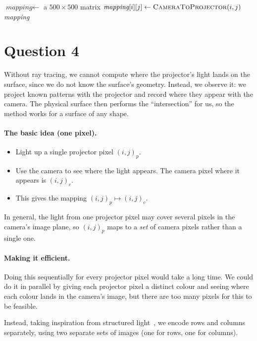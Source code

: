 \documentclass[11pt]{article}
\begin{document}
\begin{algorithmic}[1]
  \State $\textit{mapping} \gets$ a $500 \times 500$ matrix
   
     
      \State $\textit{mapping}[i][j] \gets \Call{CameraToProjector}{i, j}$
    \EndFor
  \EndFor
  \State \Return \textit{mapping}
\EndFunction
\end{algorithmic}

\section*{Question 4}

Without ray tracing, we cannot compute where the projector's light lands on the surface,
since we do not know the surface's geometry. Instead, we observe it: we project known
patterns with the projector and record where they appear with the camera. The physical
surface then performs the ``intersection'' for us, so the method works for a surface of
any shape.

\paragraph{The basic idea (one pixel).}
\begin{itemize}
  \item Light up a single projector pixel $(i, j)_p$.
  \item Use the camera to see where the light appears. The camera pixel where it appears
        is $(i, j)_c$.
  \item This gives the mapping $(i, j)_p \mapsto (i, j)_c$.
\end{itemize}
In general, the light from one projector pixel may cover several pixels in the camera's
image plane, so $(i, j)_p$ maps to a \emph{set} of camera pixels rather than a single one.

\paragraph{Making it efficient.}
Doing this sequentially for every projector pixel would take a long time. We could do it
in parallel by giving each projector pixel a distinct colour and seeing where each colour
lands in the camera's image, but there are too many pixels for this to be feasible.

Instead, taking inspiration from structured light~\cite{structuredlight}, we encode rows
and columns separately, using two separate sets of images (one for rows, one for columns).
\end{document}
